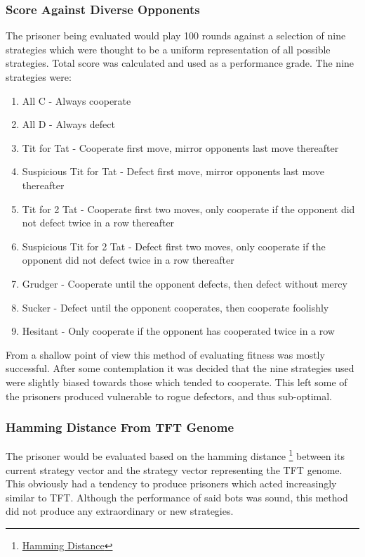 \documentclass[12pt]{article}
\begin{document}
\subsubsection{Score Against Diverse Opponents}
The prisoner being evaluated would play 100 rounds against a selection of nine
strategies which were thought to be a uniform representation of all possible
strategies.  Total score was calculated and used as a performance grade.
The nine strategies were:
\begin{enumerate}
    \item All C - Always cooperate
    \item All D - Always defect
    \item Tit for Tat - Cooperate first move, mirror opponents last move thereafter
    \item Suspicious Tit for Tat - Defect first move, mirror opponents last move
        thereafter
    \item Tit for 2 Tat - Cooperate first two moves, only cooperate if the
        opponent did not defect twice in a row thereafter
    \item Suspicious Tit for 2 Tat - Defect first two moves, only cooperate if the
        opponent did not defect twice in a row thereafter
    \item Grudger - Cooperate until the opponent defects, then defect without mercy
    \item Sucker - Defect until the opponent cooperates, then cooperate foolishly
    \item Hesitant - Only cooperate if the opponent has cooperated twice in a row
\end{enumerate}

From a shallow point of view this method of evaluating fitness was mostly
successful.  After some contemplation it was decided that the
nine strategies used were slightly biased towards those which tended to cooperate.
This left some of the prisoners produced vulnerable to rogue defectors,
and thus sub-optimal.

\subsubsection{Hamming Distance From TFT Genome}
The prisoner would be evaluated based on the hamming distance
\footnote
{\href{https://en.wikipedia.org/wiki/Hamming distance}{Hamming Distance}}
between its current strategy vector and the strategy vector representing
the TFT genome.  This obviously had a tendency to produce prisoners which
acted increasingly similar to TFT.  Although the performance of said bots
was sound, this method did not produce any extraordinary or new strategies.
\end{document}
